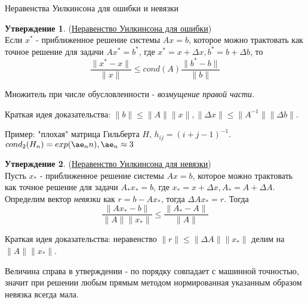 \documentclass[specialist, subf, href, colorlinks=true, 12pt, times, mtpro, final]{disser}
\theoremstyle{definition}
\newtheorem{state}{Утверждение}[section]
\begin{document}
{    \begin{center} Неравенства Уилкинсона для ошибки и невязки\end{center}

    \begin{state} (\hyperlink {lects.56}{Неравенство Уилкинсона для ошибки})\\
    Если $x^*$ - приближенное решение системы $Ax = b$, которое можно трактовать как точное решение для задачи $Ax^* = b^*$, где $x^* = x + \Delta x, b^* = b + \Delta b$, то
	$$
	\frac{\|x^* - x\|}{\|x\|} \le cond (A) \frac{\|b^*-b\|}{\|b\|}
	$$
    \end{state}
    Множитель при числе обусловленности - \emph{возмущение правой части}.

    Краткая идея доказательства: $\|b\| \le \|A\| \|x\|, \|\Delta x\| \le \|A^{-1}\|\|\Delta b\|$.

    Пример: "плохая" матрица Гильберта $H$, $h_{ij} = (i + j - 1)^{-1}$. $cond_2 (H_n) = exp(\ae_n n), \ae_n \approx 3$

    \begin{state} (\hyperlink {lects.57}{Неравенство Уилкинсона для невязки})\\
    Пусть $x_*$ - приближенное решение системы $Ax = b$, которое можно трактовать как точное решение для задачи $A_*x_* = b$, где $x_* = x + \Delta x, A_* = A + \Delta A$. Определим вектор 
    \emph{невязки} как $r = b - Ax_*$, тогда $\Delta A x_* = r$. Тогда 
	$$
	\frac{\|Ax_* - b\|}{\|A\|\|x_*\|} \le \frac{\|A_*- A\|}{\|A\|}
	$$
    \end{state}
   Краткая идея доказательства: неравенство $\|r\| \le \|\Delta A\|\|x_*\|$ делим на $\|A\|\|x_*\|$.

   Величина справа в утверждении - по порядку совпадает с машинной точностью, значит при решении любым прямым методом нормированная указанным образом невязка всегда мала.


}
\end{document}
